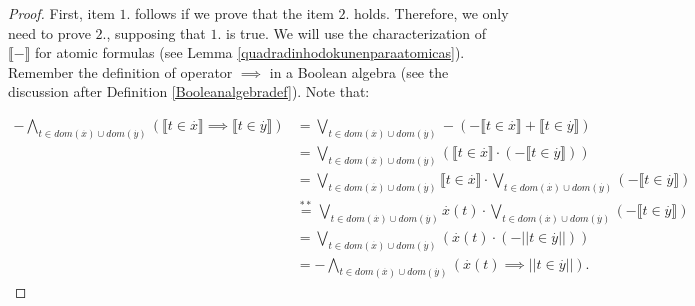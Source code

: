 \documentclass[10pt,longbibliography]{article}
\newcommand{\ydot}{\overset{.}{y}}
\newcommand{\xdot}{\overset{.}{x}}
\newcommand{\lb}{\llbracket}
\newcommand{\rb}{\rrbracket}
\begin{document}
\begin{proof}
	First, item $1.$ follows if we prove that the item $2.$ holds. Therefore, we only need to prove $2.$, supposing that $1.$ is true. We will use the characterization of $\lb - \rb$ for atomic formulas (see Lemma \ref{quadradinhodokunenparaatomicas}). Remember the definition of operator $\implies$ in a Boolean algebra (see the discussion after {Definition \ref{Booleanalgebradef}}). Note that:
	
	
	
	
	\begin{align*}
		- \underset{t \in dom(\xdot)\cup dom(\ydot)}{\bigwedge}( \lb t \in \xdot \rb \implies \lb t \in \ydot \rb) &= \underset{t \in dom(\xdot)\cup dom(\ydot)}{\bigvee} - ( - \lb t \in \xdot \rb + \lb t \in \ydot \rb) \\
		& =\underset{t \in dom(\xdot)\cup dom(\ydot)}{\bigvee} (\lb t \in \xdot \rb \cdot (-\lb t \in \ydot \rb)) \\
		& = \underset{t \in dom(\xdot)\cup dom(\ydot)}{\bigvee} \lb t \in \xdot \rb \cdot \underset{t \in dom(\xdot)\cup dom(\ydot)}{\bigvee}(-\lb t \in \ydot \rb) \\
		& \overset{**}{=} \underset{t \in dom(\xdot)\cup dom(\ydot)}{\bigvee} \xdot(t) \cdot \underset{t \in dom(\xdot)\cup dom(\ydot)}{\bigvee} (- \lb t \in \ydot \rb) \\ 
		&= \underset{t \in dom(\xdot)\cup dom(\ydot)}{\bigvee}(\xdot(t) \cdot (- || t \in \ydot ||)) \\
		&= - \underset{t \in dom(\xdot)\cup dom(\ydot)}{\bigwedge}(\xdot(t) \implies || t \in \ydot||).
	\end{align*}
	

\end{proof}
\end{document}
